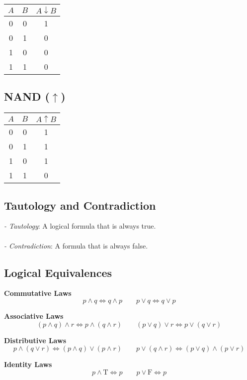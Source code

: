 \begin{multicols}{2}
\begin{tabular}{ccc}
\toprule
$A$ & $B$ & $A \downarrow B$ \\
\midrule
0 & 0 & 1 \\
0 & 1 & 0 \\
1 & 0 & 0 \\
1 & 1 & 0 \\
\bottomrule
\end{tabular}

\vspace{1em}

\subsection*{NAND ($\uparrow$)}

\begin{tabular}{ccc}
\toprule
$A$ & $B$ & $A \uparrow B$ \\
\midrule
0 & 0 & 1 \\
0 & 1 & 1 \\
1 & 0 & 1 \\
1 & 1 & 0 \\
\bottomrule
\end{tabular}

\end{multicols}
\medskip
\subsection{Tautology and Contradiction}

\textit{- Tautology}: A logical formula that is always true.
\\\\
\textit{- Contradiction}: A formula that is always false.

\newpage
\subsection{Logical Equivalences}
\textbf{Commutative Laws}
\[
p \land q \Leftrightarrow q \land p \qquad p \lor q \Leftrightarrow q \lor p
\]

\textbf{Associative Laws}
\[
(p \land q) \land r \Leftrightarrow p \land (q \land r) \qquad (p \lor q) \lor r \Leftrightarrow p \lor (q \lor r)
\]

\textbf{Distributive Laws}
\[
p \land (q \lor r) \Leftrightarrow (p \land q) \lor (p \land r) \qquad
p \lor (q \land r) \Leftrightarrow (p \lor q) \land (p \lor r)
\]

\textbf{Identity Laws}
\[
p \land \text{T} \Leftrightarrow p \qquad p \lor \text{F} \Leftrightarrow p
\]


